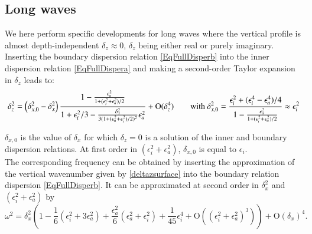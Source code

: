 \subsection{Long waves}
\label{SubSectionLongWavesrealdz}
We here perform specific developments for long waves where the vertical profile is almost depth-independent $\delta_z \approx 0$, $\delta_z$ being either real or purely imaginary.
Inserting the boundary dispersion relation \ref{EqFullDisperb} into the inner dispersion relation \ref{EqFullDispera} and making a second-order Taylor expansion in $\delta_z$ leads to:
\begin{equation}
	\delta_z^2=\left(
	\delta_{x,0}^2-\delta_x^2
	\right)
	\frac{1-\frac{\epsilon_a^2}{1+(\epsilon_i^2+\epsilon_a^2)/2}}{1+\epsilon_i^2/3-\frac{\delta_x^2}{3(1+(\epsilon_a^2+\epsilon_i^2)/2)^2}\epsilon_a^2}+\mathrm{O}(\delta_z^4)
\qquad\hbox{with }
\delta_{x,0}^2
=
\frac{\epsilon_i^2+(\epsilon_i^4-\epsilon_a^4)/4}{1-\frac{\epsilon_a^2}{1+(\epsilon_i^2+\epsilon_a^2)/2}}
\approx \epsilon_i^2
	\label{deltazsurface}
\end{equation}

%
$\delta_{x,0}$ is the value of $\delta_x$ for which $\delta_z=0$ is a solution of the inner and boundary dispersion relations. At first order in $(\epsilon_i^2+\epsilon_a^2)$, $\delta_{x,0}$ is equal to $\epsilon_i$.\\
The corresponding frequency can be obtained by inserting the approximation of the vertical wavenumber given by \ref{deltazsurface} into the boundary relation dispersion \ref{EqFullDisperb}. It can be approximated at second order in $\delta_x^2$ and $(\epsilon_i^2+\epsilon_a^2)$ by
\begin{equation}
	\omega^2 = \delta_x^2 \left(
	1
	-\frac{1}{6}\left(
	\epsilon_i^2+3\epsilon_a^2
	\right)
	+\frac{\epsilon_a^2}{6}\left(\epsilon_a^2+\epsilon_i^2\right)+\frac{1}{45}\epsilon_i^4
	+\mathrm{O}((\epsilon_i^2+\epsilon_a^2)^3)
	\right)
	+\mathrm{O}(\delta_x)^4.
	\label{eqomegalongwavereal}
\end{equation}
%
